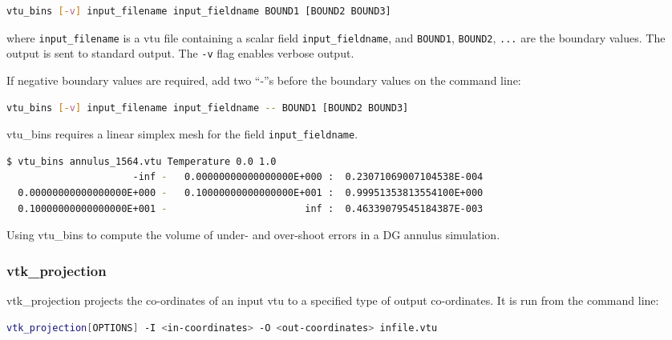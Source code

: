\begin{lstlisting}[language = Bash]
vtu_bins [-v] input_filename input_fieldname BOUND1 [BOUND2 BOUND3]
\end{lstlisting}

where \lstinline[language = Bash]+input_filename+ is a vtu file containing a scalar
field \lstinline[language = Bash]+input_fieldname+, and
\lstinline[language = Bash]+BOUND1+, \lstinline[language = Bash]+BOUND2+,
\lstinline[language = Bash]+...+ are the boundary values. The output is sent to
standard output. The \lstinline[language = Bash]+-v+ flag enables verbose output.

If negative boundary values are required, add two ``-''s before the boundary
values on the command line:

\begin{lstlisting}[language = Bash]
vtu_bins [-v] input_filename input_fieldname -- BOUND1 [BOUND2 BOUND3]
\end{lstlisting}

vtu\_bins requires a linear simplex mesh for the field
\lstinline[language = Bash]+input_fieldname+.

\begin{example}
  \begin{lstlisting}[language = Bash]
$ vtu_bins annulus_1564.vtu Temperature 0.0 1.0
                      -inf -   0.00000000000000000E+000 :  0.23071069007104538E-004
  0.00000000000000000E+000 -   0.10000000000000000E+001 :  0.99951353813554100E+000
  0.10000000000000000E+001 -                        inf :  0.46339079545184387E-003
  \end{lstlisting}
\caption{Using vtu\_bins to compute the volume of under- and over-shoot errors in
         a DG annulus simulation.}
\end{example}


\subsubsection{vtk\_projection}
\label{sect:vtkprojection}
vtk\_projection projects the co-ordinates of an input vtu to a specified type of output co-ordinates. It is run from the command line:
\begin{lstlisting}[language = Bash]
vtk_projection[OPTIONS] -I <in-coordinates> -O <out-coordinates> infile.vtu
\end{lstlisting}

